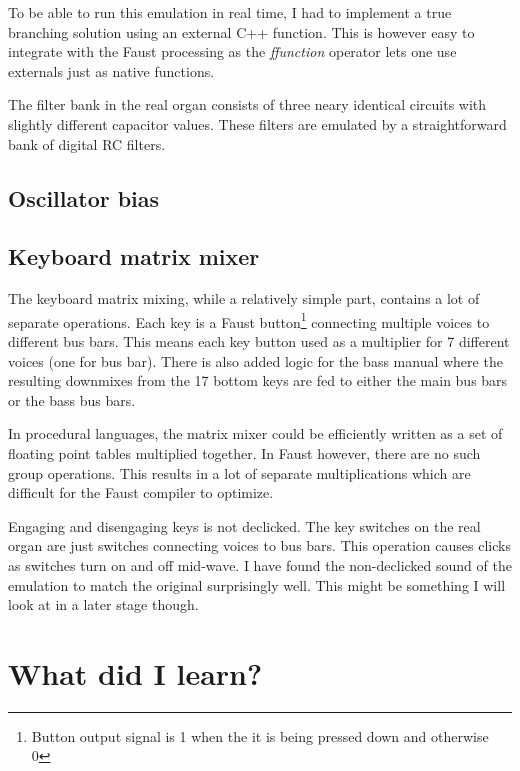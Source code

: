 \documentclass[11pt,a4paper]{article}
\begin{document}
To be able to run this emulation in real time, I had to implement a true branching solution using an external C++ function. This is however easy to integrate with the Faust processing as the \emph{ffunction} operator lets one use externals just as native functions.

The filter bank in the real organ consists of three neary identical circuits with slightly different capacitor values. These filters are emulated by a straightforward bank of digital RC filters\cite{rc-filter}.%

\subsection{Oscillator bias}
\label{section:oscillator-bias}

\subsection{Keyboard matrix mixer}

The keyboard matrix mixing, while a relatively simple part, contains a lot of separate operations. Each key is a Faust button\footnote{Button output signal is 1 when the it is being pressed down and otherwise 0} connecting multiple voices to different bus bars. This means each key button used as a multiplier for 7 different voices (one for bus bar). There is also added logic for the bass manual where the resulting downmixes from the 17 bottom keys are fed to either the main bus bars or the bass bus bars.

In procedural languages, the matrix mixer could be efficiently written as a set of floating point tables multiplied together. In Faust however, there are no such group operations. This results in a lot of separate multiplications which are difficult for the Faust compiler to optimize.

Engaging and disengaging keys is not declicked. The key switches on the real organ are just switches connecting voices to bus bars. This operation causes clicks as switches turn on and off mid-wave. I have found the non-declicked sound of the emulation to match the original surprisingly well. This might be something I will look at in a later stage though.




\section{What did I learn?}
\end{document}
